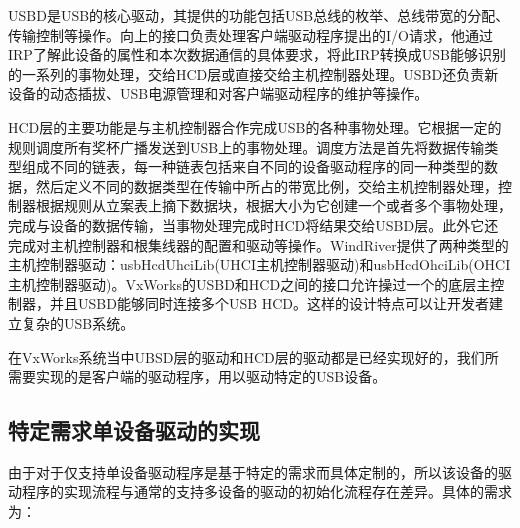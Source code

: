 	USBD是USB的核心驱动，其提供的功能包括USB总线的枚举、总线带宽的分配、传输控制等操作。向上的接口负责处理客户端驱动程序提出的I/O请求，他通过IRP了解此设备的属性和本次数据通信的具体要求，将此IRP转换成USB能够识别的一系列的事物处理，交给HCD层或直接交给主机控制器处理。USBD还负责新设备的动态插拔、USB电源管理和对客户端驱动程序的维护等操作。
	
	HCD层的主要功能是与主机控制器合作完成USB的各种事物处理。它根据一定的规则调度所有奖杯广播发送到USB上的事物处理。调度方法是首先将数据传输类型组成不同的链表，每一种链表包括来自不同的设备驱动程序的同一种类型的数据，然后定义不同的数据类型在传输中所占的带宽比例，交给主机控制器处理，控制器根据规则从立案表上摘下数据块，根据大小为它创建一个或者多个事物处理，完成与设备的数据传输，当事物处理完成时HCD将结果交给USBD层。此外它还完成对主机控制器和根集线器的配置和驱动等操作。WindRiver提供了两种类型的主机控制器驱动：usbHcdUhciLib(UHCI主机控制器驱动)和usbHcdOhciLib(OHCI主机控制器驱动)。VxWorks的USBD和HCD之间的接口允许操过一个的底层主控制器，并且USBD能够同时连接多个USB HCD。这样的设计特点可以让开发者建立复杂的USB系统。

	在VxWorks系统当中UBSD层的驱动和HCD层的驱动都是已经实现好的，我们所需要实现的是客户端的驱动程序，用以驱动特定的USB设备。	


\subsection{特定需求单设备驱动的实现}

	由于对于仅支持单设备驱动程序是基于特定的需求而具体定制的，所以该设备的驱动程序的实现流程与通常的支持多设备的驱动的初始化流程存在差异。具体的需求为：

